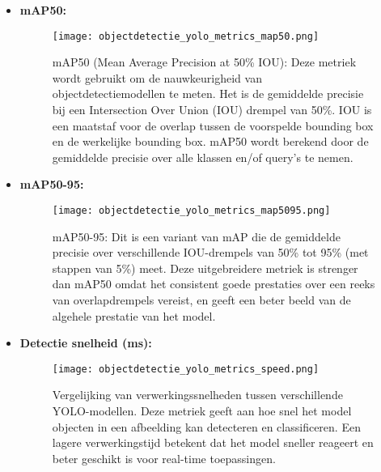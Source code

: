 \begin{itemize}
\begin{itemize}
\begin{figure}[H]
      \label{fig:recall}
    \end{figure}
    \newpage
    \item \textbf{mAP50:}
    \begin{figure}[H]
      \texttt{[image: objectdetectie\_yolo\_metrics\_map50.png]}
      \caption{mAP50 (Mean Average Precision at 50\% IOU): Deze metriek wordt gebruikt om de nauwkeurigheid van objectdetectiemodellen te meten. Het is de gemiddelde precisie bij een Intersection Over Union (IOU) drempel van 50\%. IOU is een maatstaf voor de overlap tussen de voorspelde bounding box en de werkelijke bounding box. mAP50 wordt berekend door de gemiddelde precisie over alle klassen en/of query’s te nemen.}
      \label{fig:map50}
    \end{figure}
    \newpage
    \item \textbf{mAP50-95:}
    \begin{figure}[H]
      \texttt{[image: objectdetectie\_yolo\_metrics\_map5095.png]}
      \caption{mAP50-95: Dit is een variant van mAP die de gemiddelde precisie over verschillende IOU-drempels van 50\% tot 95\% (met stappen van 5\%) meet. Deze uitgebreidere metriek is strenger dan mAP50 omdat het consistent goede prestaties over een reeks van overlapdrempels vereist, en geeft een beter beeld van de algehele prestatie van het model.}
      \label{fig:map5095}
    \end{figure}
    \newpage
    \item \textbf{Detectie snelheid (ms):}
    \begin{figure}[H]
      \centering
      \texttt{[image: objectdetectie\_yolo\_metrics\_speed.png]}
      \caption{Vergelijking van verwerkingssnelheden tussen verschillende YOLO-modellen. Deze metriek geeft aan hoe snel het model objecten in een afbeelding kan detecteren en classificeren. Een lagere verwerkingstijd betekent dat het model sneller reageert en beter geschikt is voor real-time toepassingen.}
      \label{fig:speed}
    \end{figure}
  \end{itemize}
\end{itemize}
